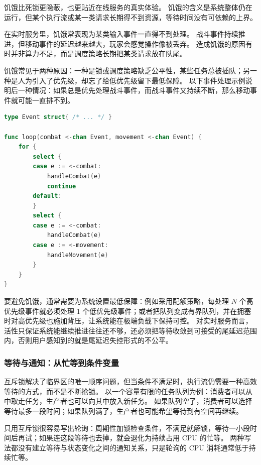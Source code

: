 饥饿比死锁更隐蔽，也更贴近在线服务的真实体验。
饥饿的含义是系统整体仍在运行，但某个执行流或某一类请求长期得不到资源，等待时间没有可依赖的上界。

在实时服务里，饥饿常表现为某类输入事件一直得不到处理。
战斗事件持续推进，但移动事件的延迟越来越大，玩家会感觉操作像被丢弃。
造成饥饿的原因有时并非算力不足，而是调度策略长期把某类请求放在队尾。

饥饿常见于两种原因：一种是锁或调度策略缺乏公平性，某些任务总被插队；另一种是人为引入了优先级，却忘了给低优先级留下最低保障。
以下事件处理示例说明后一种情况：如果总是优先处理战斗事件，而战斗事件又持续不断，那么移动事件就可能一直排不到。

\begin{tcolorbox}[title=饥饿：优先级策略让某类事件长期得不到处理（示意）]
\begin{lstlisting}[style=codeblock, language=go]
type Event struct{ /* ... */ }

func loop(combat <-chan Event, movement <-chan Event) {
    for {
        select {
        case e := <-combat:
            handleCombat(e)
            continue
        default:
        }
        select {
        case e := <-combat:
            handleCombat(e)
        case e := <-movement:
            handleMovement(e)
        }
    }
}
\end{lstlisting}
\end{tcolorbox}

要避免饥饿，通常需要为系统设置最低保障：例如采用配额策略，每处理 $N$ 个高优先级事件就必须处理 1 个低优先级事件；或者把队列变成有界队列，并在拥塞时对高优先级也施加背压，让系统能在极端负载下保持可控。
对实时服务而言，活性只保证系统能继续推进往往还不够，还必须把等待收敛到可接受的尾延迟范围内，否则用户感知到的就是尾延迟失控形式的不公平。

\subsubsection{等待与通知：从忙等到条件变量}\label{sec3:condition-variable}

互斥锁解决了临界区的唯一顺序问题，但当条件不满足时，执行流仍需要一种高效等待的方式，而不是不断抢锁。
以一个容量有限的任务队列为例：消费者可以从中取走任务，生产者也可以向其中放入新任务。
如果队列空了，消费者可以选择等待最多一段时间；如果队列满了，生产者也可能希望等待到有空间再继续。

只用互斥锁很容易写出轮询：周期性加锁检查条件，不满足就解锁，等待一小段时间后再试；如果连这段等待也去掉，就会退化为持续占用 CPU 的忙等。
两种写法都没有建立等待与状态变化之间的通知关系，只是轮询的 CPU 消耗通常低于持续忙等。


